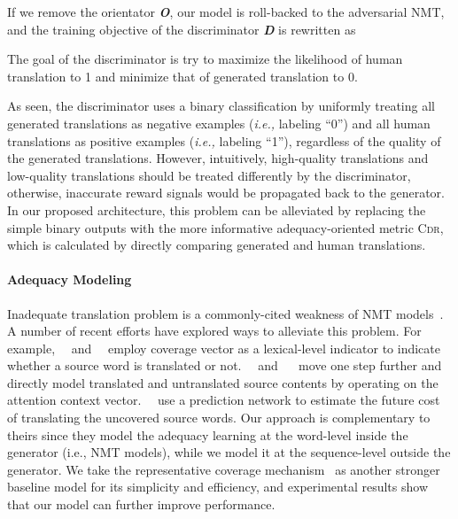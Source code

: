 \documentclass[letterpaper]{article} \usepackage{aaai19}  \usepackage{times}  \usepackage{helvet}  \usepackage{courier}  \usepackage{url}  \usepackage{graphicx}  \frenchspacing  \setlength{\pdfpagewidth}{8.5in}  \setlength{\pdfpageheight}{11in}  \usepackage{amsmath}
\begin{document}
If we remove the orientator {\bf \em O}, our model is roll-backed to the adversarial NMT, and the training objective of the discriminator {\bf \em D} is rewritten as

The goal of the discriminator is try to maximize the likelihood of human translation  to 1 and minimize that of generated translation  to 0.


As seen, the discriminator uses a binary classification by uniformly treating all generated translations as negative examples (\emph{i.e.,}\xspace labeling ``0'') and all human translations as positive examples (\emph{i.e.,}\xspace labeling ``1''), regardless of the quality of the generated translations. However, intuitively, high-quality translations and low-quality translations should be treated differently by the discriminator, otherwise, inaccurate reward signals would be propagated back to the generator. In our proposed architecture, this problem can be alleviated by replacing the simple binary outputs with the more informative adequacy-oriented metric \textsc{Cdr}, which is calculated by directly comparing generated and human translations.





\paragraph{Adequacy Modeling}
Inadequate translation problem is a commonly-cited weakness of NMT models~\cite{tu2016modeling}. A number of recent efforts have explored ways to alleviate this problem. For example,~\citeauthor{tu2016modeling}~ and~\citeauthor{Mi:2016:EMNLP}~ employ coverage vector as a lexical-level indicator to indicate whether a source word is translated or not.~\citeauthor{Zheng:2018:TACL}~ and ~\citeauthor{Meng:2018:IJCAI}~ move one step further and directly model translated and untranslated source contents by operating on the attention context vector.~\citeauthor{He:2017:NIPS}~ use a prediction network to estimate the future cost of translating the uncovered source words.
Our approach is complementary to theirs since they model the adequacy learning at the word-level inside the generator (i.e., NMT models), while we model it at the sequence-level outside the generator.
We take the representative coverage mechanism~\cite{tu2016modeling} as another stronger baseline model for its simplicity and efficiency, and experimental results show that our model can further improve performance.
\end{document}

